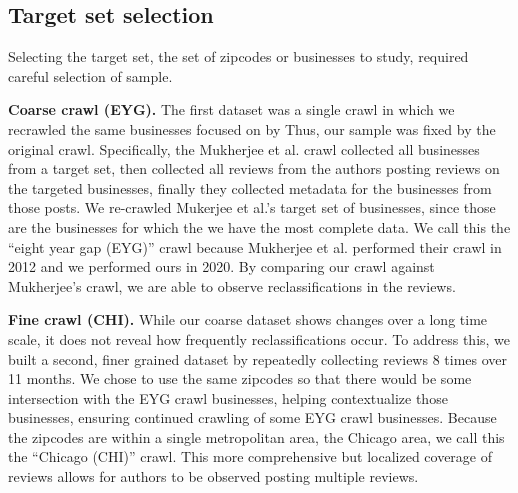 \subsection{Target set selection} \label{subsec:target_set}
Selecting the target set, the set of zipcodes or businesses to study, required careful selection of sample.


\textbf{Coarse crawl (EYG).} 
The first dataset was a single crawl in which we recrawled the same businesses focused on by \citet{mukherjee2013yelp} Thus, our sample was fixed by the original crawl. Specifically, the Mukherjee et al. crawl collected all businesses from a target set, then collected all reviews from the authors posting reviews on the targeted businesses, finally they collected metadata for the businesses from those posts. We re-crawled Mukerjee et al.'s target set of businesses, since those are the businesses for which the we have the most complete data. We call this the ``eight year gap (EYG)'' crawl because Mukherjee et al. performed their crawl in 2012 and we performed ours in 2020. By comparing our crawl against Mukherjee's crawl, we are able to observe reclassifications in the reviews.


\textbf{Fine crawl (CHI).}
While our coarse dataset shows changes over a long time scale, it does not reveal how frequently reclassifications occur. To address this, we built a second, finer grained dataset by repeatedly collecting reviews 8 times over 11 months. We chose to use the same zipcodes so that there would be some intersection with the EYG crawl businesses, helping contextualize those businesses, ensuring continued crawling of some EYG crawl businesses. Because the zipcodes are within a single metropolitan area, the Chicago area, we call this the ``Chicago (CHI)'' crawl. This more comprehensive but localized coverage of reviews allows for authors to be observed posting multiple reviews.

